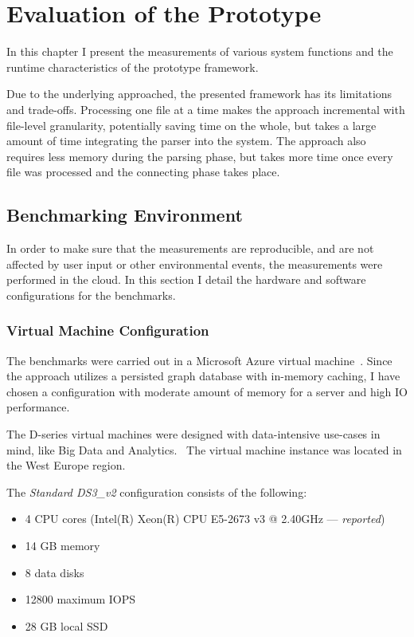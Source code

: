 \chapter{Evaluation of the Prototype}
\label{chap:evaluation-of-the-prototype}
In this chapter I present the measurements of various system functions and the runtime characteristics of the prototype framework.

Due to the underlying approached, the presented framework has its limitations and trade-offs. Processing one file at a time makes the approach incremental with file-level granularity, potentially saving time on the whole, but takes a large amount of time integrating the parser into the system. The approach also requires less memory during the parsing phase, but takes more time once every file was processed and the connecting phase takes place.

\section{Benchmarking Environment}
In order to make sure that the measurements are reproducible, and are not affected by user input or other environmental events, the measurements were performed in the cloud. In this section I detail the hardware and software configurations for the benchmarks.

\subsection{Virtual Machine Configuration}
The benchmarks were carried out in a Microsoft Azure virtual machine~\cite{azure-vm}. Since the approach utilizes a persisted graph database with in-memory caching, I have chosen a configuration with moderate amount of memory for a server and high IO performance.

The D-series virtual machines were designed with data-intensive use-cases in mind, like Big Data and Analytics.~\cite{d-series} The virtual machine instance was located in the West Europe region.

The \emph{Standard DS3\_v2} configuration consists of the following:
\begin{itemize}[topsep=0pt]
  \item 4 CPU cores (Intel(R) Xeon(R) CPU E5-2673 v3 @ 2.40GHz --- \emph{reported})
  \item 14 GB memory
  \item 8 data disks
  \item 12800 maximum IOPS
  \item 28 GB local SSD
\end{itemize}

